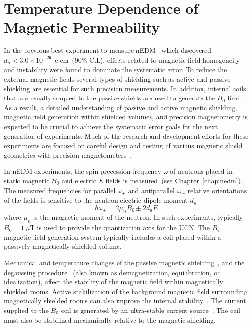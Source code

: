 \chapter{Temperature Dependence of Magnetic Permeability\label{chap:muofT}}



In the previous best experiment to measure
nEDM~\cite{Baker2006,Pendlebury2015} which discovered
$d_n<3.0\times 10^{-26}$~e$\cdot$cm~(90\% C.L), effects related to
magnetic field homogeneity and instability were found to dominate the
systematic error. To reduce the external magnetic fields several types
of shielding such as active and passive shielding are essential for
such precision measurements. In addition, internal coils that are
usually coupled to the passive shields are used to generate the $B_0$
field. As a result, a detailed understanding of passive and active
magnetic shielding, magnetic field generation within shielded volumes,
and precision magnetometry is expected to be crucial to achieve the
systematic error goals for the next generation of experiments. Much of
the research and development efforts for these experiments are focused
on careful design and testing of various magnetic shield geometries
with precision magnetometers~\cite{altarev2014magnetically,
  brys2005magnetic,afach2014dynamic,patton2014all}.

In nEDM experiments, the spin precession frequency $\omega$ of neutrons
placed in static magnetic $B_0$ and electric $E$ fields is
measured~(see Chapter~\ref{chap:nedm}). The measured frequencies for
parallel $\omega_+$ and antiparallel $\omega_-$ relative orientations of the
fields is sensitive to the neutron electric dipole moment $d_n$
\begin{equation}
\hbar\omega_\pm=2\mu_nB_0\pm 2d_nE
\end{equation}
where $\mu_n$ is the magnetic moment of the neutron.
In such experiments, typically $B_0=1~\mu$T is used to provide the
quantization axis for the UCN. The $B_0$ magnetic
field generation system typically includes a coil placed within a
passively magnetically shielded volume.


Mechanical and temperature changes of the passive magnetic
shielding~\cite{voigt2013,thiel2007demagnetization}, and the degaussing
procedure~\cite{thiel2007demagnetization,altarev2015minimizing,sun2016dynamic}
(also known as demagnetization, equilibration, or idealization),
affect the stability of the magnetic field within magnetically
shielded rooms. Active stabilization of the background magnetic field
surrounding magnetically shielded rooms can also improve the internal
stability~\cite{voigt2013,afach2014dynamic,Franke_thesis}. The
current supplied to the $B_0$ coil is generated by an ultra-stable
current source~\cite{brys2005magnetic}. The coil must also be
stabilized mechanically relative to the magnetic shielding.


